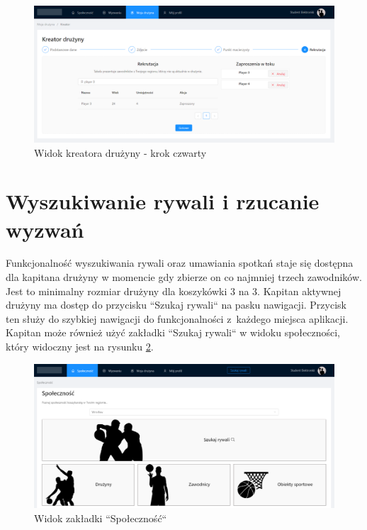 \begin{figure}[H]
\centering
\includegraphics[width=\linewidth]{065-dzialanie/rys/ss-team-5.PNG}
\caption{Widok kreatora drużyny - krok czwarty}
\label{fig:ss-team-5}
\end{figure}

\section{Wyszukiwanie rywali i rzucanie wyzwań}

Funkcjonalność wyszukiwania rywali oraz umawiania spotkań staje się dostępna dla kapitana drużyny w momencie gdy zbierze on co najmniej trzech zawodników. Jest to minimalny rozmiar drużyny dla koszykówki 3 na 3. Kapitan aktywnej drużyny ma dostęp do przycisku ``Szukaj rywali`` na pasku nawigacji. Przycisk ten służy do szybkiej nawigacji do funkcjonalności z~każdego miejsca aplikacji. Kapitan może również użyć zakładki ``Szukaj rywali`` w widoku społeczności, który widoczny jest na rysunku \ref{fig:ss-search-0}. 

\begin{figure}[H]
\centering
\includegraphics[width=\linewidth]{065-dzialanie/rys/ss-search-0.PNG}
\caption{Widok zakładki ``Społeczność``}
\label{fig:ss-search-0}
\end{figure}

